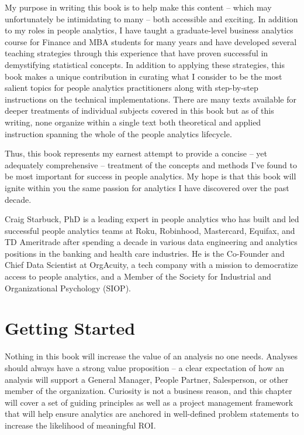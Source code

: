 \documentclass[
]{book}
\begin{document}
My purpose in writing this book is to help make this content -- which may unfortunately be intimidating to many -- both accessible and exciting. In addition to my roles in people analytics, I have taught a graduate-level business analytics course for Finance and MBA students for many years and have developed several teaching strategies through this experience that have proven successful in demystifying statistical concepts. In addition to applying these strategies, this book makes a unique contribution in curating what I consider to be the most salient topics for people analytics practitioners along with step-by-step instructions on the technical implementations. There are many texts available for deeper treatments of individual subjects covered in this book but as of this writing, none organize within a single text both theoretical and applied instruction spanning the whole of the people analytics lifecycle.

Thus, this book represents my earnest attempt to provide a concise -- yet adequately comprehensive -- treatment of the concepts and methods I've found to be most important for success in people analytics. My hope is that this book will ignite within you the same passion for analytics I have discovered over the past decade.

Craig Starbuck, PhD is a leading expert in people analytics who has built and led successful people analytics teams at Roku, Robinhood, Mastercard, Equifax, and TD Ameritrade after spending a decade in various data engineering and analytics positions in the banking and health care industries. He is the Co-Founder and Chief Data Scientist at OrgAcuity, a tech company with a mission to democratize access to people analytics, and a Member of the Society for Industrial and Organizational Psychology (SIOP).

\hypertarget{getting-started}{%
\chapter{Getting Started}\label{getting-started}}

Nothing in this book will increase the value of an analysis no one needs. Analyses should always have a strong value proposition -- a clear expectation of how an analysis will support a General Manager, People Partner, Salesperson, or other member of the organization. Curiosity is not a business reason, and this chapter will cover a set of guiding principles as well as a project management framework that will help ensure analytics are anchored in well-defined problem statements to increase the likelihood of meaningful ROI.
\end{document}
